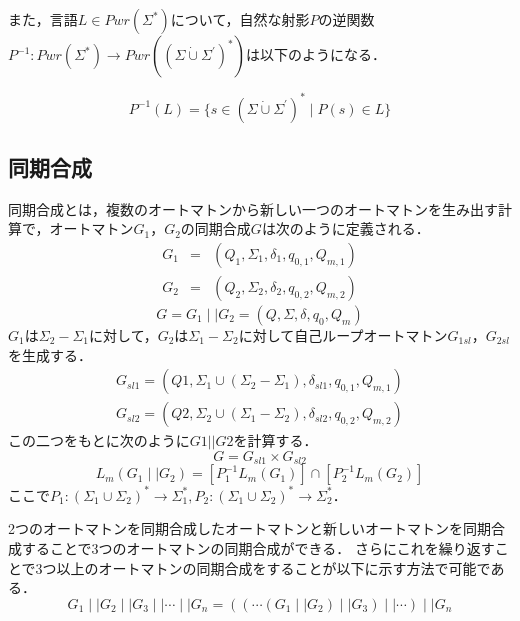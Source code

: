 \documentclass[dvipdfmx]{newthesis}
\begin{document}
また，言語$L\in Pwr(\Sigma^\ast)$について，自然な射影$P$の逆関数$P^{-1}\colon Pwr(\Sigma^\ast)\rightarrow Pwr((\Sigma\dot{\cup}\Sigma^\prime)^\ast)$は以下のようになる．

\begin{equation}
    P^{-1}(L)=\{s\in(\Sigma\dot{\cup}\Sigma^\prime)^\ast\mid P(s)\in L\}
\end{equation}

\subsection{同期合成}

同期合成とは，複数のオートマトンから新しい一つのオートマトンを生み出す計算で，オートマトン$G_1，G_2$の同期合成$G$は次のように定義される．
\begin{eqnarray}
    G_1&=&(Q_1,\Sigma_1,\delta_1,q_{0,1},Q_{m,1})\\
    G_2&=&(Q_2,\Sigma_2,\delta_2,q_{0,2},Q_{m,2})
\end{eqnarray}
\begin{equation}
    G=G_1\mid\mid G_2=(Q,\Sigma,\delta,q_0,Q_m)
\end{equation}
$G_1$は$\Sigma_2-\Sigma_1$に対して，$G_2$は$\Sigma_1-\Sigma_2$に対して自己ループオートマトン$G_{1sl}$，$G_{2sl}$を生成する．
\begin{eqnarray}
    G_{sl1}=(Q1,\Sigma_1\cup(\Sigma_2-\Sigma_1),\delta_{sl1},q_{0,1},Q_{m,1})\\
    G_{sl2}=(Q2,\Sigma_2\cup(\Sigma_1-\Sigma_2),\delta_{sl2},q_{0,2},Q_{m,2})
\end{eqnarray}
この二つをもとに次のように$G1||G2$を計算する．
\begin{equation}
    G=G_{sl1}\times G_{sl2}
\end{equation}
\begin{equation}
    L_m(G_1\mid\mid G_2) = [P_1^{-1}L_m(G_1)]\cap[P_2^{-1}L_m(G_2)]
\end{equation}
$ここでP_1\colon(\Sigma_1\cup\Sigma_2)^\ast\rightarrow\Sigma_1^\ast, P_2\colon(\Sigma_1\cup\Sigma_2)^\ast\rightarrow\Sigma_2^\ast$．

2つのオートマトンを同期合成したオートマトンと新しいオートマトンを同期合成することで3つのオートマトンの同期合成ができる．
さらにこれを繰り返すことで3つ以上のオートマトンの同期合成をすることが以下に示す方法で可能である．
\begin{equation}
    G_1\mid\mid G_2\mid\mid G_3\mid\mid\cdots\mid\mid G_n=((\cdots (G_1\mid\mid G_2)\mid\mid G_3)\mid\mid\cdots)\mid\mid G_n
\end{equation}
\end{document}
